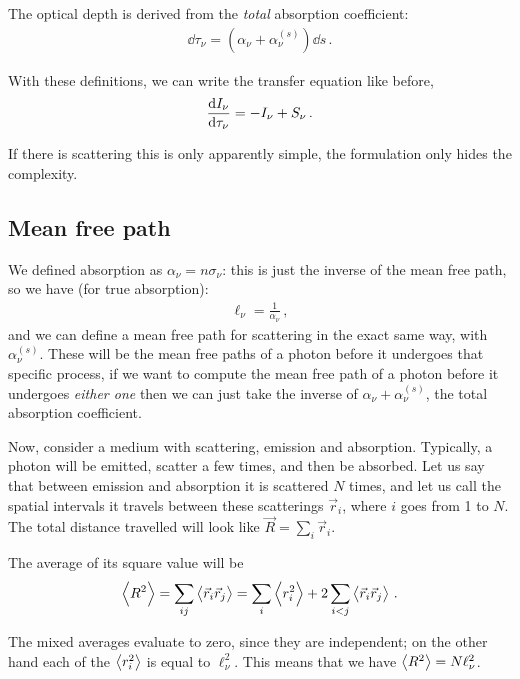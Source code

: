 \documentclass[main.tex]{subfiles}
\begin{document}
The optical depth is derived from the \emph{total} absorption coefficient: 
%
\begin{align}
\dd{\tau_{\nu }} = (\alpha_{\nu } + \alpha_{\nu }^{(s)}) \dd{s}
\,.
\end{align}

With these definitions, we can write the transfer equation like before, 
%
\begin{align}
\dv{I_\nu }{\tau_{\nu }} = - I_\nu + S_\nu 
\,.
\end{align}

If there is scattering this is only apparently simple, the formulation only hides the complexity. 

\subsection{Mean free path}

We defined absorption as \(\alpha_{\nu } = n \sigma_{\nu }\): this is just the inverse of the mean free path, so we have (for true absorption):
%
\begin{align}
\ell_{\nu } = \frac{1}{\alpha_{\nu }}
\,,
\end{align}
%
and we can define a mean free path for scattering in the exact same way, with \(\alpha_{\nu }^{(s)}\). 
These will be the mean free paths of a photon before it undergoes that specific process, if we want to compute the mean free path of a photon before it undergoes \emph{either one} then we can just take the inverse of \(\alpha_{\nu } + \alpha_{\nu }^{(s)}\), the total absorption coefficient. 

Now, consider a medium with scattering, emission and absorption. 
Typically, a photon will be emitted, scatter a few times, and then be absorbed. Let us say that between emission and absorption it is scattered \(N\) times, and let us call the spatial intervals it travels between these scatterings \(\vec{r}_i\), where \(i\) goes from 1 to \(N\). 
The total distance travelled will look like \(\vec{R} = \sum _{i} \vec{r}_i\). 

The average of its square value will be 
%
\begin{align}
\expval{R^2} = \sum _{ij} \expval{\vec{r}_i \vec{r}_j}
= \sum _{i} \expval{r_i^2} + 2 \sum _{i<j} \expval{\vec{r}_i \vec{r}_j}
\,.
\end{align}

The mixed averages evaluate to zero, since they are independent; on the other hand each of the \(\expval{r_i^2}\) is equal to \(\ell_\nu^2\). 
This means that we have \(\expval{R^2} = N \ell_\nu^2\). 
\end{document}
